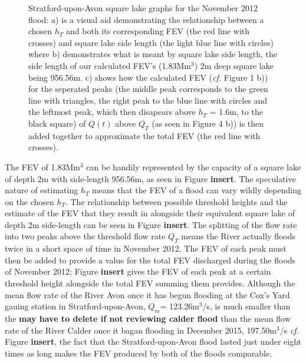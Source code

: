 \documentclass[11pt,a4paper]{article}
\begin{document}
\begin{figure}[ht!]
\centering
{}
\hfill
{}
\caption{Stratford-upon-Avon square lake graphs for the November 2012 flood: a) is a visual aid demonstrating the relationship between a chosen $h_T$ and both its corresponding FEV (the red line with crosses) and square lake side length (the light blue line with circles) where b) demonstrates what is meant by square lake side length, the side length of our calculated FEV's (1.83Mm$^3$) 2m deep square lake being 956.56m. c) shows how the calculated FEV (\textit{cf.} Figure 1 b)) for the seperated peaks (the middle peak corresponds to the green line with triangles, the right peak to the blue line with circles and the leftmost peak, which then disapears above $h_T$ = 1.6m, to the black square) of $Q(t)$ above $Q_T$ (as seen in Figure 4 b)) is then added together to approximate the total FEV (the red line with crosses).}
\end{figure}

The FEV of 1.83Mm$^3$ can be handily represented by the capacity of a square lake of depth 2m with side-length 956.56m, as seen in Figure \textbf{insert}. The speculative nature of estimating $h_T$ means that the FEV of a flood can vary wildly depending on the chosen $h_T$. The relationship between possible threshold heights and the estimate of the FEV that they result in alongside their equivalent square lake of depth 2m side-length can be seen in Figure \textbf{insert}. The splitting of the flow rate into two peaks above the threshold flow rate $Q_T$ means the River actually floods twice in a short space of time in November 2012. The FEV of each peak must then be added to provide a value for the total FEV discharged during the floods of November 2012{;} Figure \textbf{insert} gives the FEV of each peak at a certain threshold height alongside the total FEV summing them provides. Although the mean flow rate of the River Avon once it has begun flooding at the Cox's Yard gauing station in Stratford-upon-Avon, $Q_m$= 123.26m$^3$/s, is much smaller than the \textbf{may have to delete if not reviewing calder flood} than the mean flow rate of the River Calder once it bagan flooding in December 2015, 197.50m$^3$/s \textit{cf.} Figure \textbf{insert}, the fact that the Stratford-upon-Avon flood lasted just under eight times as long makes the FEV produced by both of the floods comparable. 
\end{document}
